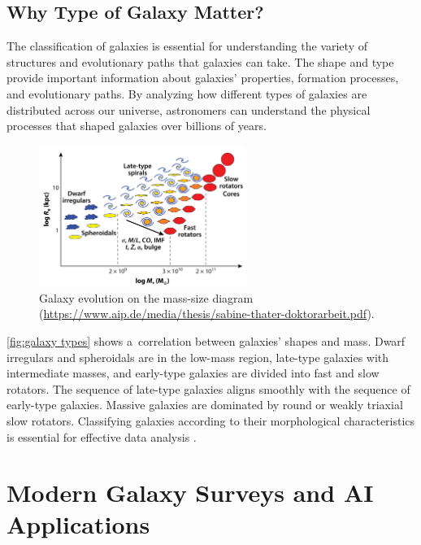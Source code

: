 \subsection*{Why Type of Galaxy Matter?}

The classification of galaxies is essential for understanding the variety of structures and evolutionary paths that galaxies can take. The shape and type provide important information about galaxies' properties, formation processes, and evolutionary paths. By analyzing how different types of galaxies are distributed across our universe, astronomers can understand the physical processes that shaped galaxies over billions of years. 

\begin{figure}[htbp]
    \centering
    \includegraphics[width=0.6\textwidth]{obrazky-figures/02-theoretical-basis/types.png}
    \caption{Galaxy evolution on the mass-size diagram (\url{https://www.aip.de/media/thesis/sabine-thater-doktorarbeit.pdf}).}
    \label{fig:galaxy types}
\end{figure}

\autoref{fig:galaxy types} shows a~correlation between galaxies' shapes and mass. Dwarf irregulars and spheroidals are in the low-mass region, late-type galaxies with intermediate masses, and early-type galaxies are divided into fast and slow rotators. The sequence of late-type galaxies aligns smoothly with the sequence of early-type galaxies. Massive galaxies are dominated by round or weakly triaxial slow rotators. Classifying galaxies according to their morphological characteristics is essential for effective data analysis \cite{cao2024galaxy}.

\section{Modern Galaxy Surveys and AI Applications}
\label{sec:modern-app}

